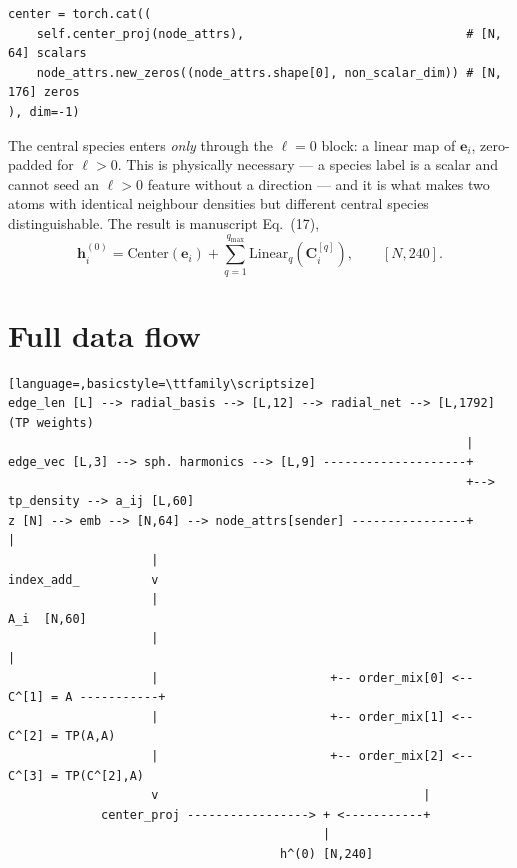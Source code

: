 \documentclass[11pt,a4paper]{article}
\begin{document}
\begin{lstlisting}
center = torch.cat((
    self.center_proj(node_attrs),                               # [N, 64] scalars
    node_attrs.new_zeros((node_attrs.shape[0], non_scalar_dim)) # [N, 176] zeros
), dim=-1)
\end{lstlisting}

The central species enters \emph{only} through the $\ell=0$ block: a linear map of
$\bm e_i$, zero-padded for $\ell>0$. This is physically necessary --- a species
label is a scalar and cannot seed an $\ell>0$ feature without a direction --- and
it is what makes two atoms with identical neighbour densities but different
central species distinguishable. The result is manuscript Eq.~(17),
\begin{equation}
\bm h^{(0)}_i = \mathrm{Center}(\bm e_i)
+ \sum_{q=1}^{q_{\max}} \mathrm{Linear}_q\!\left(\bm C^{[q]}_i\right),
\qquad [N,240].
\end{equation}

\section{Full data flow}

\begin{lstlisting}[language=,basicstyle=\ttfamily\scriptsize]
edge_len [L] --> radial_basis --> [L,12] --> radial_net --> [L,1792]  (TP weights)
                                                                |
edge_vec [L,3] --> sph. harmonics --> [L,9] --------------------+
                                                                +--> tp_density --> a_ij [L,60]
z [N] --> emb --> [N,64] --> node_attrs[sender] ----------------+                      |
                    |                                              index_add_          v
                    |                                                          A_i  [N,60]
                    |                                                                  |
                    |                        +-- order_mix[0] <-- C^[1] = A -----------+
                    |                        +-- order_mix[1] <-- C^[2] = TP(A,A)
                    |                        +-- order_mix[2] <-- C^[3] = TP(C^[2],A)
                    v                                     |
             center_proj -----------------> + <-----------+
                                            |
                                      h^(0) [N,240]
\end{lstlisting}
\end{document}
